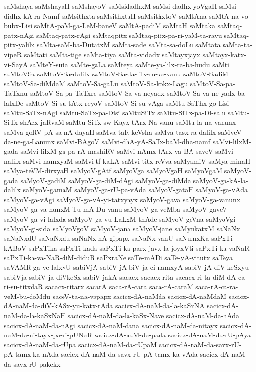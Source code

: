 {saMshaya
saMshayaH
saMshayoV
saMsidadhxM
saMsi-dadhx-yoVgaH
saMsi-didhx-kA-ra-Namf
saMsithxta
saMsithxtaH
saMsithxtoV
saMtAna
saMtA-na-vo-bubx-Lisi
saMtA-paM-ga-LeM-baneV
saMtA-padiM
saMtaH
saMtaka
saMtaq-patx-nAgi
saMtaq-patx-rAgi
saMtaqpitx
saMtaq-pitx-pa-ri-yaM-ta-ravu
saMtaq-pitx-yalilx
saMta-saM-ba-DutatxM
saMta-sade
saMta-sa-doLu
saMtata
saMta-ta-vipeR
saMtati
saMta-tige
saMta-tiya
saMta-vidadx
saMtayxjayx
saMtayx-katx-vi-SayA
saMteY-suta
saMte-gaLa
saMteya
saMte-ya-lilx-ra-ba-hudu
saMti
saMtoVSa
saMtoV-Sa-dalilx
saMtoV-Sa-da-lilx-ru-va-vanu
saMtoV-SadiM
saMtoV-Sa-diMdaM
saMtoV-Sa-gaLu
saMtoV-Sa-kokx-Lagu
saMtoV-Sa-pa-TaTxnu
saMtoV-Sa-pa-TaTxre
saMtoV-Sa-va-neyadx
saMtoV-Sa-va-ne-yadx-ba-lalxDe
saMtoV-Si-su-tAtx-reyoV
saMtoV-Si-su-vAga
saMtu-SaThx-go-Lisi
saMtu-SaTx-nAgi
saMtu-SaTx-pa-Disi
saMtuSiTx
saMtu-SiTx-pa-Di-salu
saMtu-SiTx-shAcx-jaRvaM
saMtu-SiTx-sw-Kayx-tArx-Na-vanu
saMtu-la-na-vanunx
saMva-goRV-pA-sa-nA-dayaH
saMva-taR-keVsha
saMva-tasx-ra-dalilx
saMveV-da-ne-ga-Lanunx
saMvi-BAgoV
saMvi-dhA-yA-SaTx-baM-dha-namf
saMvi-lilxM-gada
saMvi-lilxM-ga-pa-rA-mashiRV
saMvi-nAmx-tArx-va-BA-saveV
saMvi-nalilx
saMvi-namxyaM
saMvi-tf-kaLA
saMvi-titx-reVva
saMyamiV
saMya-minaH
saMya-teVM-dirxyaH
saMyoV-gAtf
saMyoVga
saMyoVgaH
saMyoVgaM
saMyoV-gada
saMyoV-gadiM
saMyoV-ga-diM-dAgi
saMyoV-ga-diMda
saMyoV-ga-kA-la-dalilx
saMyoV-gamaM
saMyoV-ga-rU-pa-vAda
saMyoV-gataH
saMyoV-ga-vAda
saMyoV-ga-vAgi
saMyoV-ga-vA-yi-tatxyayx
saMyoV-gava
saMyoV-ga-vanunx
saMyoV-ga-va-nunxM-Tu-mA-Du-vanu
saMyoV-ga-veMba
saMyoV-gaveV
saMyoV-ga-vi-lalxda
saMyoV-ga-vu-LaLxM-thAde
saMyoV-geVna
saMyoVgi
saMyoV-gi-sida
saMyoVgoV
saMyoV-jana
saMyoV-jane
saMyukatxM
saNaNx
saNaNxdU
saNaNxdu
saNaNx-nA-gipapx
saNaNx-vanU
saNumxKa
saPxTi-kABoV
saPxTika
saPxTi-kada
saPxTi-ka-parx-javx-la-joyxVti
saPxTi-ka-vaNaR
saPxTi-ka-va-NaR-diM-diduR
saPxraNe
saTe-mADi
saTe-yA-yitutx
saTeya
saVAMR-ga-ve-lalxvU
sabiVjA
sabiV-jA-biV-ja-ci-namxyA
sabiV-jA-diV-keSxyu
sabiVja
sabiV-ja-diVkeSx
sabiV-jakA
sacacx
sacacx-rita
sacacx-ri-ta-diM-dA-ca-ri-su-titxdaR
sacacx-ritarx
sacarA
saca-rA-cara
saca-rA-caraM
saca-rA-ca-ra-veM-bu-doMdu
saceV-ta-na-vapapx
sacicx-dA-naMda
sacicx-dA-naMdaM
sacicx-dA-naM-da-diV-kASx-yu-katx-rAda
sacicx-dA-naM-da-la-kaSxNA
sacicx-dA-naM-da-la-kaSxNaH
sacicx-dA-naM-da-la-kaSx-Nave
sacicx-dA-naM-da-nAda
sacicx-dA-naM-da-nAgi
sacicx-dA-naM-dana
sacicx-dA-naM-da-nitayx
sacicx-dA-naM-da-ni-tayx-pa-ri-pUNaR
sacicx-dA-naM-da-pada
sacicx-dA-naM-da-rU-pAya
sacicx-dA-naM-da-rUpa
sacicx-dA-naM-da-rUpaM
sacicx-dA-naM-da-savx-rU-pA-tamx-ka-nAda
sacicx-dA-naM-da-savx-rU-pA-tamx-ka-vAda
sacicx-dA-naM-da-savx-rU-pakekx
}
